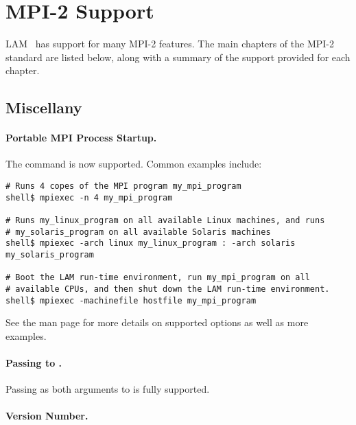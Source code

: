 \section{MPI-2 Support}

LAM \lamversion\ has support for many MPI-2 features.  The main
chapters of the MPI-2 standard are listed below, along with a summary
of the support provided for each chapter.


\subsection{Miscellany}


\paragraph{Portable MPI Process Startup.}

The  command is now supported.  Common examples include:

\lstset{style=lam-shell}
\begin{lstlisting}
# Runs 4 copes of the MPI program my_mpi_program
shell$ mpiexec -n 4 my_mpi_program

# Runs my_linux_program on all available Linux machines, and runs
# my_solaris_program on all available Solaris machines
shell$ mpiexec -arch linux my_linux_program : -arch solaris my_solaris_program

# Boot the LAM run-time environment, run my_mpi_program on all
# available CPUs, and then shut down the LAM run-time environment.
shell$ mpiexec -machinefile hostfile my_mpi_program
\end{lstlisting}

See the  man page for more details on supported
options as well as more examples.


\paragraph{Passing  to .}

Passing  as both arguments to  is
fully supported.


\paragraph{Version Number.}

